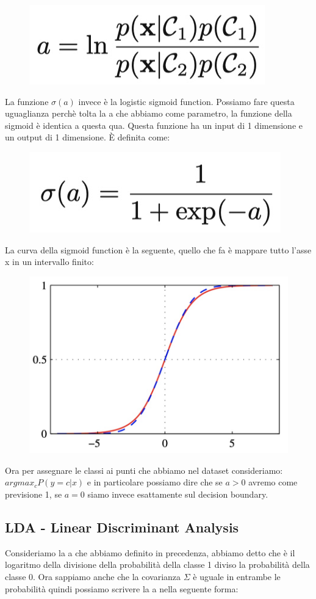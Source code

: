\documentclass[14pt]{extreport}
\begin{document}
\begin{figure}[H]
	\centering
	\includegraphics[width=0.3\linewidth]{166.jpeg}
\end{figure}

La funzione $\sigma(a)$ invece è la logistic sigmoid function. Possiamo fare questa uguaglianza perchè tolta la a che abbiamo come parametro, la
funzione della sigmoid è identica a questa qua. Questa funzione ha un input di 1 dimensione e un output di 1 dimensione. È definita come:

\begin{figure}[H]
	\centering
	\includegraphics[width=0.3\linewidth]{168.jpeg}
\end{figure}

La curva della sigmoid function è la seguente, quello che fa è mappare tutto l'asse x in un intervallo finito:

\begin{figure}[H]
	\centering
	\includegraphics[width=0.4\linewidth]{169.jpeg}
\end{figure}

Ora per assegnare le classi ai punti che abbiamo nel dataset consideriamo: $argmax_c P(y=c|x)$ e in particolare possiamo dire che se $a>0$ avremo come
previsione 1, se $a=0$ siamo invece esattamente sul decision boundary.


\subsection{LDA - Linear Discriminant Analysis}

Consideriamo la a che abbiamo definito in precedenza, abbiamo detto che è il logaritmo della  divisione della probabilità della classe 1 diviso la
probabilità della classe 0. Ora sappiamo anche che la covarianza $\Sigma$ è uguale in entrambe le probabilità quindi possiamo scrivere la a nella
seguente forma:
\end{document}
